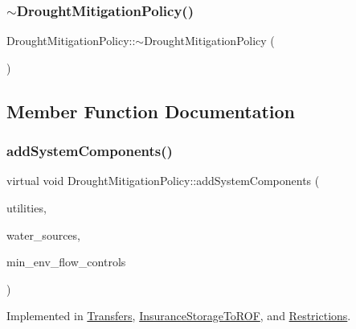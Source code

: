 \subsubsection{\texorpdfstring{$\sim$\+Drought\+Mitigation\+Policy()}{~DroughtMitigationPolicy()}}
{\footnotesize\ttfamily Drought\+Mitigation\+Policy\+::$\sim$\+Drought\+Mitigation\+Policy (\begin{DoxyParamCaption}{ }\end{DoxyParamCaption})\hspace{0.3cm}{\ttfamily [virtual]}}



\subsection{Member Function Documentation}
\mbox{\label{classDroughtMitigationPolicy_aaab042a79d781afe8e08753b7012372a}} 
\subsubsection{\texorpdfstring{add\+System\+Components()}{addSystemComponents()}}
{\footnotesize\ttfamily virtual void Drought\+Mitigation\+Policy\+::add\+System\+Components (\begin{DoxyParamCaption}\item[{vector$<$ \mbox{\hyperlink{classUtility}{Utility}} $\ast$$>$}]{utilities,  }\item[{vector$<$ \mbox{\hyperlink{classWaterSource}{Water\+Source}} $\ast$$>$}]{water\+\_\+sources,  }\item[{vector$<$ \mbox{\hyperlink{classMinEnvFlowControl}{Min\+Env\+Flow\+Control}} $\ast$$>$}]{min\+\_\+env\+\_\+flow\+\_\+controls }\end{DoxyParamCaption})\hspace{0.3cm}{\ttfamily [pure virtual]}}



Implemented in \mbox{\hyperlink{classTransfers_a3c1930dbeb1273c1c0be93ad5ca57357}{Transfers}}, \mbox{\hyperlink{classInsuranceStorageToROF_ac7d317a7f189739275960e4f021108d8}{Insurance\+Storage\+To\+R\+OF}}, and \mbox{\hyperlink{classRestrictions_ab0a2b62495d6cdd8d1fedba419c05c37}{Restrictions}}.

